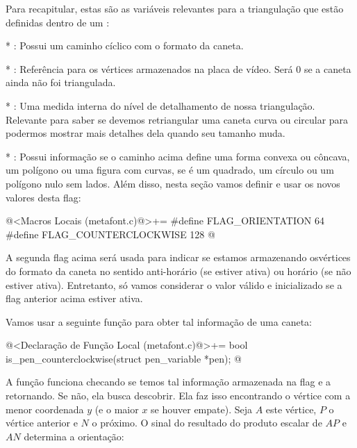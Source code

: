 {{{{{{Para recapitular, estas são as variáveis relevantes para a
triangulação que estão definidas dentro de um :

* : Possui um caminho
  cíclico com o formato da caneta.

* : Referência para os vértices armazenados
  na placa de vídeo. Será 0 se a caneta ainda não foi triangulada.

* : Uma medida interna do nível
  de detalhamento de nossa triangulação. Relevante para saber se devemos
  retriangular uma caneta curva ou circular para podermos mostrar mais
  detalhes dela quando seu tamanho muda.

* : Possui informação se o caminho acima define
  uma forma convexa ou côncava, um polígono ou uma figura com curvas,
  se é um quadrado, um círculo ou um polígono nulo sem lados. Além
  disso, nesta seção vamos definir e usar os novos valores desta flag:

\iniciocodigo
@<Macros Locais (metafont.c)@>+=
#define FLAG_ORIENTATION      64
#define FLAG_COUNTERCLOCKWISE 128
@
\fimcodigo

A segunda flag acima será usada para indicar se estamos armazenando
osvértices do formato da caneta no sentido anti-horário (se estiver
ativa) ou horário (se não estiver ativa). Entretanto, só vamos
considerar o valor válido e inicializado se a flag anterior acima
estiver ativa.

Vamos usar a seguinte função para obter tal informação de uma caneta:

\iniciocodigo
@<Declaração de Função Local (metafont.c)@>+=
bool is_pen_counterclockwise(struct pen_variable *pen);
@
\fimcodigo

A função funciona checando se temos tal informação armazenada na flag
e a retornando. Se não, ela busca descobrir. Ela faz isso encontrando
o vértice com a menor coordenada $y$ (e o maior $x$ se houver
empate). Seja $A$ este vértice, $P$ o vértice anterior e $N$ o
próximo. O sinal do resultado do produto escalar de $AP$ e $AN$
determina a orientação:

}}}}}}
